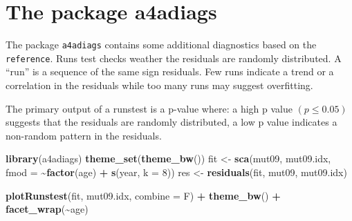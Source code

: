 \documentclass[
]{book}
\newenvironment{Shaded}{\begin{snugshade}}{\end{snugshade}}
\newcommand{\AttributeTok}[1]{\textcolor[rgb]{0.13,0.29,0.53}{#1}}
\newcommand{\DecValTok}[1]{\textcolor[rgb]{0.00,0.00,0.81}{#1}}
\newcommand{\FunctionTok}[1]{\textcolor[rgb]{0.13,0.29,0.53}{\textbf{#1}}}
\newcommand{\NormalTok}[1]{#1}
\newcommand{\OtherTok}[1]{\textcolor[rgb]{0.56,0.35,0.01}{#1}}
\newcommand{\SpecialCharTok}[1]{\textcolor[rgb]{0.81,0.36,0.00}{\textbf{#1}}}
\begin{document}
\hypertarget{the-package-a4adiags}{%
\section{The package a4adiags}\label{the-package-a4adiags}}

The package \texttt{a4adiags} contains some additional diagnostics based on the \texttt{reference}. Runs test checks weather the residuals are randomly distributed. A ``run'' is a sequence of the same sign residuals. Few runs indicate a trend or a correlation in the residuals while too many runs may suggest overfitting.

The primary output of a runstest is a p-value where: a high p value \((p\leq 0.05)\) suggests that the residuals are randomly distributed, a low p value indicates a non-random pattern in the residuals.

\begin{Shaded}
\begin{Highlighting}[]
\FunctionTok{library}\NormalTok{(a4adiags)}
\FunctionTok{theme\_set}\NormalTok{(}\FunctionTok{theme\_bw}\NormalTok{())}
\NormalTok{fit }\OtherTok{\textless{}{-}} \FunctionTok{sca}\NormalTok{(mut09, mut09.idx, }\AttributeTok{fmod =} \SpecialCharTok{\textasciitilde{}}\FunctionTok{factor}\NormalTok{(age) }\SpecialCharTok{+} \FunctionTok{s}\NormalTok{(year, }\AttributeTok{k =} \DecValTok{8}\NormalTok{))}
\NormalTok{res }\OtherTok{\textless{}{-}} \FunctionTok{residuals}\NormalTok{(fit, mut09, mut09.idx)}
\end{Highlighting}
\end{Shaded}

\begin{Shaded}
\begin{Highlighting}[]
\FunctionTok{plotRunstest}\NormalTok{(fit, mut09.idx, }\AttributeTok{combine =}\NormalTok{ F) }\SpecialCharTok{+} \FunctionTok{theme\_bw}\NormalTok{() }\SpecialCharTok{+} \FunctionTok{facet\_wrap}\NormalTok{(}\SpecialCharTok{\textasciitilde{}}\NormalTok{age)}
\end{Highlighting}
\end{Shaded}
\end{document}
